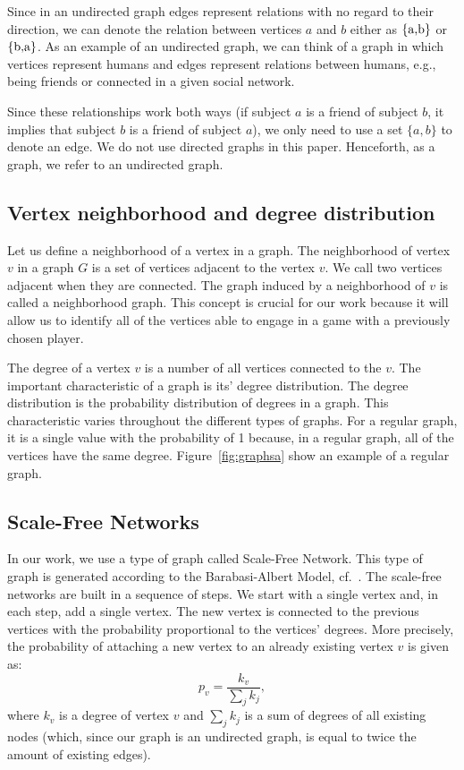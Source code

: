 \documentclass[english, twoside, 12pt, a4paper]{article}
\theoremstyle{definition}
\theoremstyle{plain}
\theoremstyle{remark}
\begin{document}
Since in an undirected graph edges represent relations with no regard to their direction, we can denote the relation between vertices $a$ and $b$ either as \(\{$a,b$\}\) or \(\{$b,a$\}\). As an example of an undirected graph, we can think of a graph in which vertices represent humans and edges represent relations between humans, e.g., being friends or connected in a given social network. 

Since these relationships work both ways (if subject \( a\) is a friend of subject \( b\), it implies that subject \(b\) is a friend of subject \(a\)), we only need to use a set \(\{a, b\}\) to denote an edge. We do not use directed graphs in this paper. Henceforth, as a graph, we refer to an undirected graph. 

\subsection{Vertex neighborhood and degree distribution}

Let us define a neighborhood of a vertex in a graph. The neighborhood of vertex $v$ in a graph $G$ is a set of vertices adjacent to the vertex $v$. We call two vertices adjacent when they are connected. The graph induced by a neighborhood of \( v \) is called a neighborhood graph. This concept is crucial for our work because it will allow us to identify all of the vertices able to engage in a game with a previously chosen player. 

The degree of a vertex $v$ is a number of all vertices connected to the $v$. The important characteristic of a graph is its' degree distribution. The degree distribution is the probability distribution of degrees in a graph. This characteristic varies throughout the different types of graphs. For a regular graph, it is a single value with the probability of 1 because, in a regular graph, all of the vertices have the same degree. Figure~\ref{fig:graphsa} show an example of a regular graph. 

\subsection{Scale-Free Networks}

In our work, we use a type of graph called Scale-Free Network. This type of graph is generated according to the Barabasi-Albert Model, cf.~\cite{albert2002statistical}. The scale-free networks are built in a sequence of steps. We start with a single vertex and, in each step, add a single vertex. The new vertex is connected to the previous vertices with the probability proportional to the vertices' degrees. More precisely, the probability of attaching a new vertex to an already existing vertex \(v\) is given as:
\[ 
p_v = \frac{k_v}{\sum_{j} k_j},
\]
where $k_v$ is a degree of vertex $v$ and $\sum_{j} k_j$ is a sum of degrees of all existing nodes (which, since our graph is an undirected graph, is equal to twice the amount of existing edges). 
\end{document}
